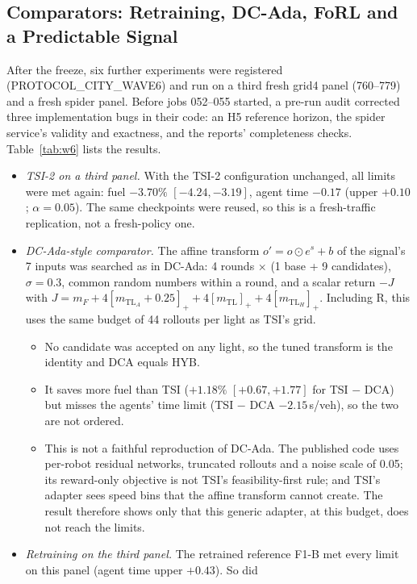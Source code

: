\subsection{Comparators: Retraining, DC-Ada, FoRL and a Predictable Signal}\label{sec:comp}\label{sec:w6}
After the freeze, six further experiments were registered (PROTOCOL\_CITY\_WAVE6) and run on a third fresh grid4 panel (760--779) and a
fresh spider panel. Before jobs 052--055 started, a pre-run audit corrected three implementation bugs in their code: an H5 reference
horizon, the spider service's validity and exactness, and the reports' completeness checks. Table~\ref{tab:w6} lists the results.
\begin{itemize}
\item \emph{TSI-2 on a third panel.} With the TSI-2 configuration unchanged, all limits were met again: fuel $-3.70\%$ $[-4.24,-3.19]$,
agent time $-0.17$ (upper $+0.10$; $\alpha=0.05$). The same checkpoints were reused, so this is a fresh-traffic replication, not a
fresh-policy one.
\item \emph{DC-Ada-style comparator.} The affine transform $o'=o\odot e^{s}+b$ of the signal's 7 inputs was searched as in DC-Ada:
4 rounds $\times$ (1 base + 9 candidates), $\sigma=0.3$, common random numbers within a round, and a scalar return
$-J$ with $J=m_F+4[m_{\mathrm{TL}_A}+0.25]_++4[m_{\mathrm{TL}}]_++4[m_{\mathrm{TL}_H}]_+$. Including R, this uses the same budget of 44
rollouts per light as TSI's grid.
\begin{itemize}\setlength\itemsep{0pt}
\item No candidate was accepted on any light, so the tuned transform is the identity and DCA equals HYB.
\item It saves more fuel than TSI ($+1.18\%$ $[+0.67,+1.77]$ for TSI $-$ DCA) but misses the agents' time limit (TSI $-$ DCA $-2.15$\,s/veh),
so the two are not ordered.
\item This is not a faithful reproduction of DC-Ada. The published code uses per-robot residual networks, truncated rollouts and a noise scale
of 0.05; its reward-only objective is not TSI's feasibility-first rule; and TSI's adapter sees speed bins that the affine transform cannot
create. The result therefore shows only that this generic adapter, at this budget, does not reach the limits.
\end{itemize}
\item \emph{Retraining on the third panel.} The retrained reference F1-B met every limit on this panel (agent time upper $+0.43$). So did

\end{itemize}
